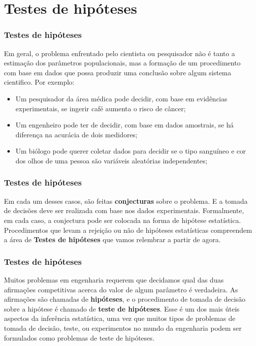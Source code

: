 \documentclass[14pt,aspectratio=1610]{beamer}
\begin{document}
\section{Testes de hipóteses}
\begin{frame}{}
\frametitle{Testes de hipóteses}
\begin{block}{}
\justifying
Em geral, o problema enfrentado pelo cientista ou pesquisador não é tanto a estimação dos parâmetros populacionais, mas a formação de um procedimento com base 
em dados que possa produzir uma conclusão sobre algum sistema cientifico. Por exemplo:
\begin{itemize}
    \item Um pesquisador da área médica pode decidir, com base em evidências experimentais, se ingerir café aumenta o risco de câncer;\pause
    \item Um engenheiro pode ter de decidir, com base em dados amostrais, se há diferença na acurácia de dois medidores;\pause
    \item Um biólogo pode querer coletar dados para decidir se o tipo sanguíneo e cor dos olhos de uma pessoa são variáveis aleatórias independentes;
\end{itemize}
\end{block}
\end{frame}

\begin{frame}{}
\frametitle{Testes de hipóteses}
\begin{block}{}
\justifying
Em cada um desses casos, são feitas \textbf{conjecturas} sobre o problema. E a tomada de decisões deve ser realizada com base nos dados experimentais. Formalmente, 
em cada caso, a conjectura pode ser colocada na forma de hipótese estatística. Procedimentos que levam a rejeição ou não de hipóteses estatísticas compreendem 
a área de \textbf{Testes de hipóteses} que vamos relembrar a partir de agora.
 \end{block}
\end{frame}

\begin{frame}{}
\frametitle{Testes de hipóteses}
\begin{block}{}
\justifying
Muitos problemas em engenharia requerem que decidamos qual das duas afirmações competitivas acerca do valor de algum parâmetro é verdadeira. As afirmações 
são chamadas de \textbf{hipóteses}, e o procedimento de tomada de decisão sobre a hipótese é chamado de \textbf{teste de hipóteses}. Esse é um dos mais úteis 
aspectos da inferência estatística, uma vez que muitos tipos de problemas de tomada de decisão, teste, ou experimentos no mundo da engenharia podem ser formulados 
como problemas de teste de hipóteses.
\end{block}
\end{frame}
\end{document}
